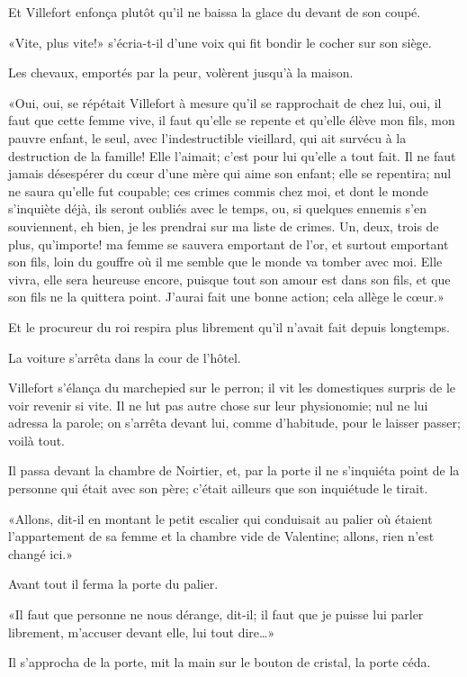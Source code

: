 Et Villefort enfonça plutôt qu'il ne baissa la glace du devant de son coupé. 

«Vite, plus vite!» s'écria-t-il d'une voix qui fit bondir le cocher sur son siège. 

Les chevaux, emportés par la peur, volèrent jusqu'à la maison. 

«Oui, oui, se répétait Villefort à mesure qu'il se rapprochait de chez lui, oui, il faut que cette femme vive, il faut qu'elle se repente et qu'elle élève mon fils, mon pauvre enfant, le seul, avec l'indestructible vieillard, qui ait survécu à la destruction de la famille! Elle l'aimait; c'est pour lui qu'elle a tout fait. Il ne faut jamais désespérer du cœur d'une mère qui aime son enfant; elle se repentira; nul ne saura qu'elle fut coupable; ces crimes commis chez moi, et dont le monde s'inquiète déjà, ils seront oubliés avec le temps, ou, si quelques ennemis s'en souviennent, eh bien, je les prendrai sur ma liste de crimes. Un, deux, trois de plus, qu'importe! ma femme se sauvera emportant de l'or, et surtout emportant son fils, loin du gouffre où il me semble que le monde va tomber avec moi. Elle vivra, elle sera heureuse encore, puisque tout son amour est dans son fils, et que son fils ne la quittera point. J'aurai fait une bonne action; cela allège le cœur.» 

Et le procureur du roi respira plus librement qu'il n'avait fait depuis longtemps. 

La voiture s'arrêta dans la cour de l'hôtel. 

Villefort s'élança du marchepied sur le perron; il vit les domestiques surpris de le voir revenir si vite. Il ne lut pas autre chose sur leur physionomie; nul ne lui adressa la parole; on s'arrêta devant lui, comme d'habitude, pour le laisser passer; voilà tout. 

Il passa devant la chambre de Noirtier, et, par la porte il ne s'inquiéta point de la personne qui était avec son père; c'était ailleurs que son inquiétude le tirait. 

«Allons, dit-il en montant le petit escalier qui conduisait au palier où étaient l'appartement de sa femme et la chambre vide de Valentine; allons, rien n'est changé ici.» 

Avant tout il ferma la porte du palier. 

«Il faut que personne ne nous dérange, dit-il; il faut que je puisse lui parler librement, m'accuser devant elle, lui tout dire\dots» 

Il s'approcha de la porte, mit la main sur le bouton de cristal, la porte céda. 

